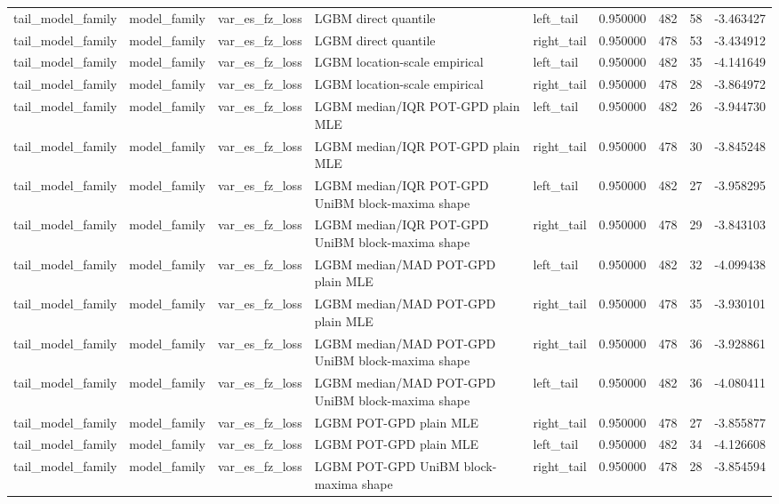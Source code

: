 \begin{tabular}{lllllrrrr}
tail\_model\_family & model\_family & var\_es\_fz\_loss & LGBM direct quantile & left\_tail & 0.950000 & 482 & 58 & -3.463427 \\
tail\_model\_family & model\_family & var\_es\_fz\_loss & LGBM direct quantile & right\_tail & 0.950000 & 478 & 53 & -3.434912 \\
tail\_model\_family & model\_family & var\_es\_fz\_loss & LGBM location-scale empirical & left\_tail & 0.950000 & 482 & 35 & -4.141649 \\
tail\_model\_family & model\_family & var\_es\_fz\_loss & LGBM location-scale empirical & right\_tail & 0.950000 & 478 & 28 & -3.864972 \\
tail\_model\_family & model\_family & var\_es\_fz\_loss & LGBM median/IQR POT-GPD plain MLE & left\_tail & 0.950000 & 482 & 26 & -3.944730 \\
tail\_model\_family & model\_family & var\_es\_fz\_loss & LGBM median/IQR POT-GPD plain MLE & right\_tail & 0.950000 & 478 & 30 & -3.845248 \\
tail\_model\_family & model\_family & var\_es\_fz\_loss & LGBM median/IQR POT-GPD UniBM block-maxima shape & left\_tail & 0.950000 & 482 & 27 & -3.958295 \\
tail\_model\_family & model\_family & var\_es\_fz\_loss & LGBM median/IQR POT-GPD UniBM block-maxima shape & right\_tail & 0.950000 & 478 & 29 & -3.843103 \\
tail\_model\_family & model\_family & var\_es\_fz\_loss & LGBM median/MAD POT-GPD plain MLE & left\_tail & 0.950000 & 482 & 32 & -4.099438 \\
tail\_model\_family & model\_family & var\_es\_fz\_loss & LGBM median/MAD POT-GPD plain MLE & right\_tail & 0.950000 & 478 & 35 & -3.930101 \\
tail\_model\_family & model\_family & var\_es\_fz\_loss & LGBM median/MAD POT-GPD UniBM block-maxima shape & right\_tail & 0.950000 & 478 & 36 & -3.928861 \\
tail\_model\_family & model\_family & var\_es\_fz\_loss & LGBM median/MAD POT-GPD UniBM block-maxima shape & left\_tail & 0.950000 & 482 & 36 & -4.080411 \\
tail\_model\_family & model\_family & var\_es\_fz\_loss & LGBM POT-GPD plain MLE & right\_tail & 0.950000 & 478 & 27 & -3.855877 \\
tail\_model\_family & model\_family & var\_es\_fz\_loss & LGBM POT-GPD plain MLE & left\_tail & 0.950000 & 482 & 34 & -4.126608 \\
tail\_model\_family & model\_family & var\_es\_fz\_loss & LGBM POT-GPD UniBM block-maxima shape & right\_tail & 0.950000 & 478 & 28 & -3.854594 \\

\end{tabular}
